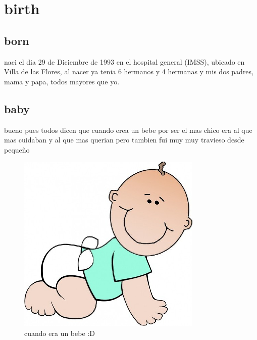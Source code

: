 \chapter {birth}
\section{born}
	naci el dia 29 de Diciembre de 1993 en el hospital general (IMSS), ubicado en Villa de las Flores, al nacer ya tenia 6 hermanos y 4 hermanas y mis dos padres, mama y papa, todos mayores que yo.
\section{baby}
	bueno pues todos dicen que cuando erea un bebe por ser el mas chico era al que mas cuidaban y al que mas querian pero tambien fui muy muy travieso desde pequeño
\begin{figure}[H]
\centering
\includegraphics{oneChapter/baby.eps}
\caption{cuando era un bebe :D}
\label{photoBaby}
\end{figure}

